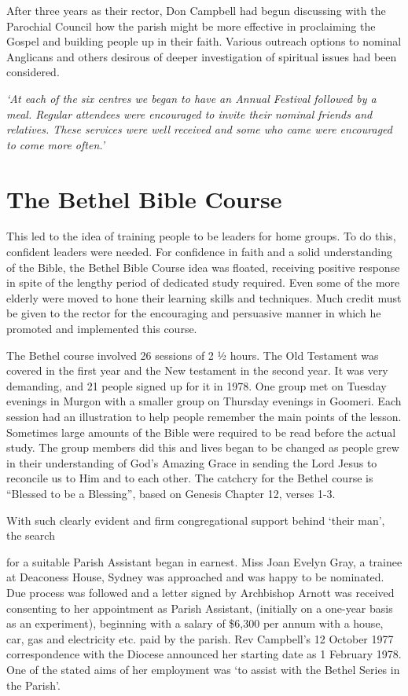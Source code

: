 After three years as their rector, Don Campbell had begun discussing with the Parochial Council how the parish might be more effective in proclaiming the Gospel and building people up in their faith. Various outreach options to nominal Anglicans and others desirous of deeper investigation of spiritual issues had been considered.

\emph{`At each of the six centres we began to have an Annual Festival followed by a meal. Regular attendees were encouraged to invite their nominal friends and relatives. These services were well received and some who came were encouraged to come more often.'}

\hypertarget{the-bethel-bible-course}{%
\section{The Bethel Bible Course}\label{the-bethel-bible-course}}

This led to the idea of training people to be leaders for home groups. To do this, confident leaders were needed. For confidence in faith and a solid understanding of the Bible, the Bethel Bible Course idea was floated, receiving positive response in spite of the lengthy period of dedicated study required. Even some of the more elderly were moved to hone their learning skills and techniques. Much credit must be given to the rector for the encouraging and persuasive manner in which he promoted and implemented this course.

The Bethel course involved 26 sessions of 2 ½ hours. The Old Testament was covered in the first year and the New testament in the second year. It was very demanding, and 21 people signed up for it in 1978. One group met on Tuesday evenings in Murgon with a smaller group on Thursday evenings in Goomeri. Each session had an illustration to help people remember the main points of the lesson. Sometimes large amounts of the Bible were required to be read before the actual study. The group members did this and lives began to be changed as people grew in their understanding of God's Amazing Grace in sending the Lord Jesus to reconcile us to Him and to each other. The catchcry for the Bethel course is ``Blessed to be a Blessing'', based on Genesis Chapter 12, verses 1-3.

With such clearly evident and firm congregational support behind `their man', the search

for a suitable Parish Assistant began in earnest. Miss Joan Evelyn Gray, a trainee at Deaconess House, Sydney was approached and was happy to be nominated. Due process was followed and a letter signed by Archbishop Arnott was received consenting to her appointment as Parish Assistant, (initially on a one-year basis as an experiment), beginning with a salary of \$6,300 per annum with a house, car, gas and electricity etc. paid by the parish. Rev Campbell's 12 October 1977 correspondence with the Diocese announced her starting date as 1 February 1978. One of the stated aims of her employment was `to assist with the Bethel Series in the Parish'.

